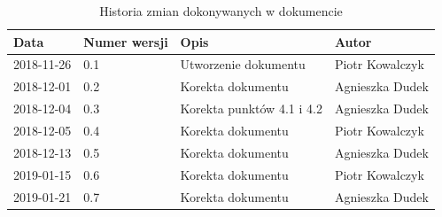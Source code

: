 \documentclass{article}
\begin{document}
\begin{titlepage}






\end{titlepage}

\addtocounter{page}{1}
\newpage

\begin{table}[h!]
	\begin{center}
		\caption{Historia zmian dokonywanych w dokumencie}
		\begin{tabular}{|l|l|l|l|}
			\hline
			Data & Numer wersji & Opis & Autor \\
			\hline \hline
			2018-11-26 & 0.1 & Utworzenie dokumentu & Piotr Kowalczyk \\
			\hline 
			2018-12-01 & 0.2 & Korekta dokumentu & Agnieszka Dudek \\
			\hline
			2018-12-04 & 0.3 & Korekta punktów 4.1 i 4.2 & Agnieszka Dudek \\
			\hline
			2018-12-05 & 0.4 & Korekta dokumentu & Piotr Kowalczyk \\
			\hline
			2018-12-13 & 0.5 & Korekta dokumentu & Agnieszka Dudek \\
			\hline
			2019-01-15 & 0.6 & Korekta dokumentu & Piotr Kowalczyk \\
			\hline			
			2019-01-21 & 0.7 & Korekta dokumentu & Agnieszka Dudek \\
			\hline
    \end{tabular}
	\end{center}
\end{table}	
\end{document}
